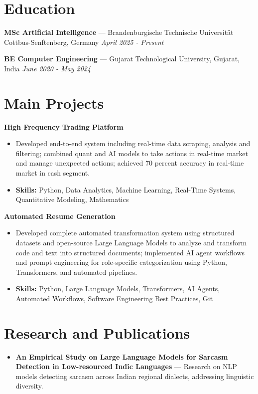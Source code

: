 \documentclass[a4paper,10pt]{article}
\begin{document}
\section*{Education}
\textbf{MSc Artificial Intelligence} — Brandenburgische Technische Universität Cottbus-Senftenberg, Germany \hfill \textit{April 2025 - Present}\par
\vspace{1.5pt}
\textbf{BE Computer Engineering} — Gujarat Technological University, Gujarat, India \hfill \textit{June 2020 - May 2024}\par

\section*{Main Projects}
\textbf{High Frequency Trading Platform}\par
\vspace{1pt}
\begin{itemize}
  \item Developed end-to-end system including real-time data scraping, analysis and filtering; combined quant and AI models to take actions in real-time market and manage unexpected actions; achieved 70 percent accuracy in real-time market in cash segment.
  \item \textbf{Skills:} Python, Data Analytics, Machine Learning, Real-Time Systems, Quantitative Modeling, Mathematics
\end{itemize}
\vspace{3pt}
\textbf{Automated Resume Generation}\par
\vspace{1pt}
\begin{itemize}
  \item Developed complete automated transformation system using structured datasets and open-source Large Language Models to analyze and transform code and text into structured documents; implemented AI agent workflows and prompt engineering for role-specific categorization using Python, Transformers, and automated pipelines.
  \item \textbf{Skills:} Python, Large Language Models, Transformers, AI Agents, Automated Workflows, Software Engineering Best Practices, Git
\end{itemize}

\section*{Research and Publications}
\begin{itemize}
\item \textbf{An Empirical Study on Large Language Models for Sarcasm Detection in Low-resourced Indic Languages} — Research on NLP models detecting sarcasm across Indian regional dialects, addressing linguistic diversity.
\end{itemize}
\end{document}
